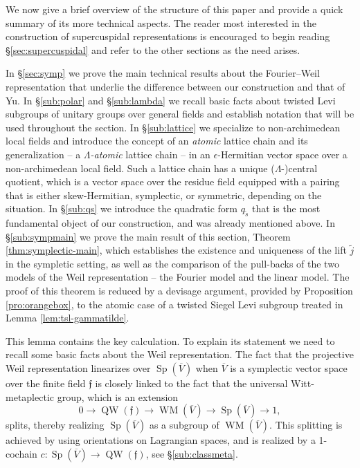 \documentclass{article}
\def\ol#1{\overline{#1}}
\DeclareMathOperator{\Sp}{Sp}
\theoremstyle{definition}
\numberwithin{equation}{subsection}
\renewcommand{\-}{\hyp{}}
\DeclareMathOperator{\WM}{WM}
\DeclareMathOperator{\QW}{QW}
\newcommand{\rf}{\mathfrak{f}}
\begin{document}
We now give a brief overview of the structure of this paper and provide a quick summary of its more technical aspects. The reader most interested in the construction of supercuspidal representations is encouraged to begin reading \S\ref{sec:supercuspidal} and refer to the other sections as the need arises.

In \S\ref{sec:symp} we prove the main technical results about the Fourier--Weil representation that underlie the difference between our construction and that of Yu. In \S\ref{sub:polar} and \S\ref{sub:lambda} we recall basic facts about twisted Levi subgroups of unitary groups over general fields and establish notation that will be used throughout the section. In \S\ref{sub:lattice} we specialize to non-archimedean local fields and introduce the concept of an \emph{atomic} lattice chain and its generalization -- a \emph{$\Lambda$-atomic} lattice chain -- in an $\epsilon$-Hermitian vector space over a non-archimedean local field. Such a lattice chain has a unique ($\Lambda$-)central quotient, which is a vector space over the residue field equipped with a pairing that is either skew-Hermitian, symplectic, or symmetric, depending on the situation. In \S\ref{sub:qs} we introduce the quadratic form $q_{\tilde s}$ that is the most fundamental object of our construction, and was already mentioned above. In \S\ref{sub:sympmain} we prove the main result of this section, Theorem \ref{thm:symplectic-main}, which establishes the existence and uniqueness of the lift $\tilde j$ in the sympletic setting, as well as the comparison of the pull-backs of the two models of the Weil representation -- the Fourier model and the linear model. The proof of this theorem is reduced by a devisage argument, provided by Proposition \ref{pro:orangebox}, to the atomic case of a twisted Siegel Levi subgroup treated in Lemma \ref{lem:tsl-gammatilde}.

This lemma contains the key calculation. To explain its statement we need to recall some basic facts about the Weil representation. The fact that the projective Weil representation linearizes over $\Sp(\ol{V})$ when $\ol{V}$ is a symplectic vector space over the finite field $\rf$ is closely linked to the fact that the universal Witt-metaplectic group, which is an extension 
\[ 0 \to \QW(\rf) \to \WM(\ol{V}) \to \Sp(\ol{V}) \to 1, \]
splits, thereby realizing $\Sp(\ol{V})$ as a subgroup of $\WM(\ol{V})$. This splitting is achieved by using orientations on Lagrangian spaces, and is realized by a 1-cochain $c : \Sp(\ol{V}) \to \QW(\rf)$, see \S\ref{sub:classmeta}. 
\end{document}
